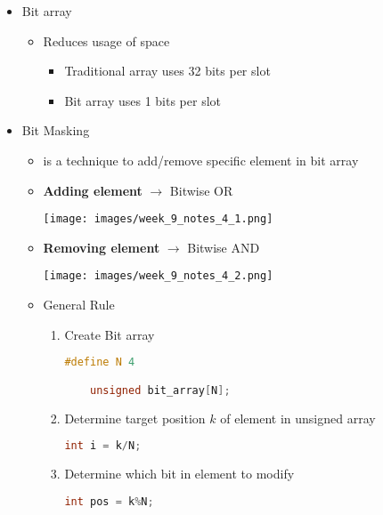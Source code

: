 \documentclass[12pt]{article}
\begin{document}
\begin{itemize}
    \item Bit array
    \begin{itemize}
        \item Reduces usage of space
        \begin{itemize}
        \item Traditional array uses 32 bits per slot
        \item Bit array uses 1 bits per slot
        \end{itemize}
    \end{itemize}
    \item Bit Masking
    \begin{itemize}
        \item is a technique to add/remove specific element in bit array
        \item \textbf{Adding element} $\to$ Bitwise OR

        \begin{center}
        \texttt{[image: images/week\_9\_notes\_4\_1.png]}
        \end{center}
        \item \textbf{Removing element} $\to$ Bitwise AND

        \begin{center}
        \texttt{[image: images/week\_9\_notes\_4\_2.png]}
        \end{center}

        \item General Rule
        \begin{enumerate}[1.]
            \item Create Bit array

    \begin{lstlisting}[language=c]
    #define N 4

    unsigned bit_array[N];
    \end{lstlisting}
            \item Determine target position $k$ of element in unsigned array
    \begin{lstlisting}[language=c]
    int i = k/N;
    \end{lstlisting}
            \item Determine which bit in element to modify

    \begin{lstlisting}[language=c]
    int pos = k%N;
    \end{lstlisting}


\end{enumerate}
\end{itemize}
\end{itemize}
\end{document}
